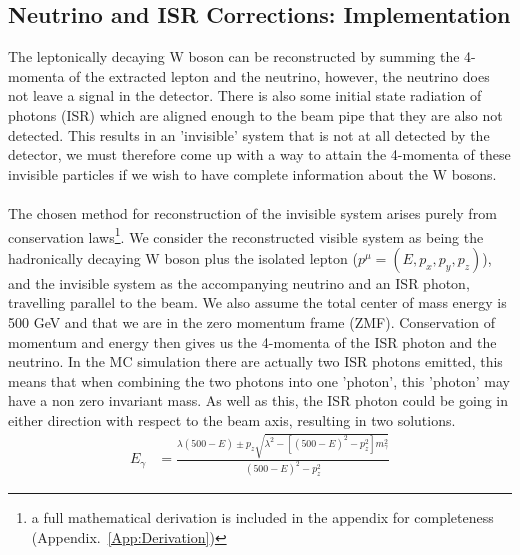 \subsection{Neutrino and ISR Corrections: Implementation}
\label{SUBSEC:ISRImplementation}
The leptonically decaying W boson can be reconstructed by summing the 4-momenta of the extracted lepton and the neutrino, however, the neutrino does not leave a signal in the detector. There is also some initial state radiation of photons (ISR) which are aligned enough to the beam pipe that they are also not detected. This results in an 'invisible' system that is not at all detected by the detector, we must therefore come up with a way to attain the 4-momenta of these invisible particles if we wish to have complete information about the W bosons.
\\\\
The chosen method for reconstruction of the invisible system arises purely from conservation laws\footnote{ a full mathematical derivation is included in the appendix for completeness (Appendix.~\ref{App:Derivation})}. We consider the reconstructed visible system as being the hadronically decaying W boson plus the isolated lepton (${p}^{\mu} = ( E,  {p}_{x}, {p}_{y}, {p}_{z})$), and the invisible system as the accompanying neutrino and an ISR photon, travelling parallel to the beam. We also assume the total center of mass energy is 500 GeV and that we are in the zero momentum frame (ZMF). Conservation of momentum and energy then gives us the 4-momenta of the ISR photon and the neutrino. In the MC simulation there are actually two ISR photons emitted, this means that when combining the two photons into one 'photon', this 'photon' may have a non zero invariant mass. As well as this, the ISR photon could be going in either direction with respect to the beam axis, resulting in two solutions.
\begin{align}
\label{EQ:Full}
{E}_{\gamma}    &= \frac{{\lambda}(500 - E)  \pm {p}_{z}\sqrt{ {\lambda}^{2} - [{(500 - E)}^{2} -{p}_{z}^{2}]{m}_{\gamma}^{2}}}{{(500 - E)}^{2} -   {p}_{z}^{2}}
   \end{align}

